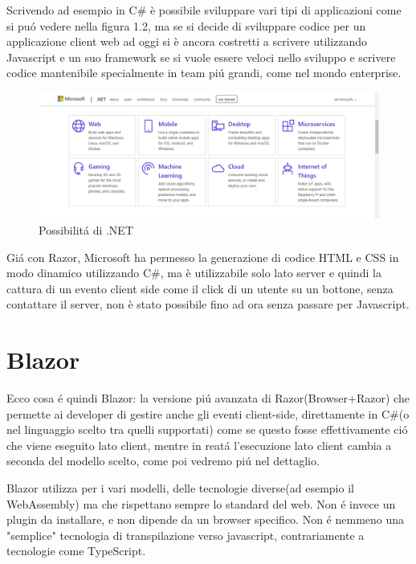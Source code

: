 Scrivendo ad esempio in C\# \`e possibile sviluppare vari tipi di applicazioni come si pu\'o vedere nella figura 1.2, ma se si decide di sviluppare codice per un applicazione client web ad oggi si \`e ancora costretti a scrivere utilizzando Javascript e un suo framework se si vuole essere veloci nello sviluppo e scrivere codice mantenibile specialmente in team pi\'u grandi, come nel mondo enterprise.

\begin{figure}[H]
\centerline{\includegraphics[scale=0.35]{figure/DotNetFrameworkCapabilities}}
\caption{Possibilit\'a di .NET}
\label{fig:DotNetCapabilities}
\end{figure}

Gi\'a con Razor\cite{razor}, Microsoft ha permesso la generazione di codice HTML e CSS in modo dinamico utilizzando C\#, ma \`e utilizzabile solo lato server e quindi la cattura di un evento client side come il click di un utente su un bottone, senza contattare il server, non \`e stato possibile fino ad ora senza passare per Javascript.

\section{Blazor}
Ecco cosa \'e quindi Blazor: la versione pi\'u avanzata di Razor(Browser+Razor\cite{blazorWikiGitHub}) che permette ai developer di gestire anche gli eventi client-side, direttamente in C\#(o nel linguaggio scelto tra quelli supportati) come se questo fosse effettivamente ci\'o che viene eseguito lato client, mentre in reat\'a l'esecuzione lato client cambia a seconda del modello scelto, come poi vedremo pi\'u nel dettaglio.

Blazor utilizza per i vari modelli, delle tecnologie diverse(ad esempio il WebAssembly) ma che rispettano sempre lo standard del web.
Non \'e invece un plugin da installare, e non dipende da un browser specifico.
Non \'e nemmeno una "semplice" tecnologia di transpilazione verso javascript, contrariamente a tecnologie come TypeScript.